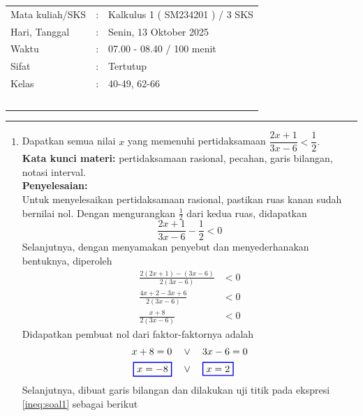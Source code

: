 \documentclass[10pt,openany,a4paper]{article}
\theoremstyle{definition}
\theoremstyle{definition}
\theoremstyle{plain}
\newenvironment{jawab}[2][tes]{
\textbf{Kata kunci materi:} #1.\\
\textbf{Penyelesaian:} #2
}{}
\begin{document}
    \begin{center}
	\begin{tabular}{lcl}
		Mata kuliah/SKS & : & Kalkulus 1 ( SM234201 ) / 3 SKS\\
		Hari, Tanggal & : & Senin, 13 Oktober 2025\\
		Waktu & : & 07.00 - 08.40 / 100 menit\\
		Sifat & : & Tertutup\\
		Kelas & : & 40-49, 62-66\\
  ~
	\end{tabular}
    
    \noindent\rule{\textwidth}{2.pt}
        \end{center}
    \begin{enumerate}
     \item Dapatkan semua nilai \(x\) yang memenuhi pertidaksamaan
    \(
        \dfrac{2x + 1}{3x - 6} < \dfrac{1}{2}.
    \)\\
\begin{jawab}[pertidaksamaan rasional, pecahan, garis bilangan, notasi interval]{
        ~\\
        Untuk menyelesaikan pertidaksamaan rasional, pastikan ruas kanan sudah bernilai nol. Dengan mengurangkan \(\frac{1}{2}\) dari kedua ruas, didapatkan
        \[
        \frac{2x + 1}{3x - 6} - \frac{1}{2} < 0
        \]
        Selanjutnya, dengan menyamakan penyebut dan menyederhanakan bentuknya, diperoleh
        \begin{align}
            \frac{2(2x+1)-(3x-6)}{2(3x-6)} &< 0\nonumber\\
             \frac{4x + 2 - 3x + 6}{2(3x - 6)} &< 0\nonumber \\
             \frac{x + 8}{2(3x - 6)} &< 0 \label{ineq:soal1}
        \end{align}
        Didapatkan pembuat nol dari faktor-faktornya adalah 
        \begin{align*}
            x+8 = 0 \quad &\vee\quad  3x - 6 = 0\\
            \colorlet{oldcolor}{.}
        \color{blue}
        \setlength{\fboxrule}{1pt} \boxed{\color{oldcolor}x=-8}\color{oldcolor}
         \quad &\vee\quad \colorlet{oldcolor}{.}
        \color{blue}
        \setlength{\fboxrule}{1pt} \boxed{\color{oldcolor}x=2}\color{oldcolor}
        \end{align*}
        Selanjutnya, dibuat garis bilangan dan dilakukan uji titik pada ekspresi \eqref{ineq:soal1} sebagai berikut
        \begin{itemize}

\end{itemize}}
\end{jawab}
\end{enumerate}
\end{document}
